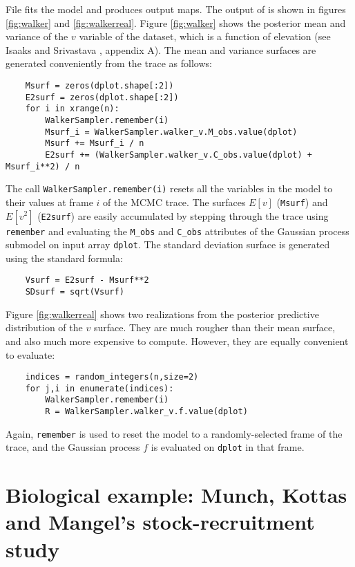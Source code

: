 File  fits the model and produces output maps.  The output of  is shown in figures \ref{fig:walker} and \ref{fig:walkerreal}. Figure \ref{fig:walker} shows the posterior mean and variance of the $v$ variable of the dataset, which is a function of elevation (see Isaaks and Srivastava \cite{isaaks}, appendix A). The mean and variance surfaces are generated conveniently from the trace as follows:
\begin{verbatim}
    Msurf = zeros(dplot.shape[:2])
    E2surf = zeros(dplot.shape[:2])
    for i in xrange(n):
        WalkerSampler.remember(i)
        Msurf_i = WalkerSampler.walker_v.M_obs.value(dplot)
        Msurf += Msurf_i / n
        E2surf += (WalkerSampler.walker_v.C_obs.value(dplot) + Msurf_i**2) / n
\end{verbatim}
The call \texttt{WalkerSampler.remember(i)} resets all the variables in the model to their values at frame $i$ of the MCMC trace. The surfaces $E[v]$ (\texttt{Msurf}) and $E[v^2]$ (\texttt{E2surf}) are easily accumulated by stepping through the trace using \texttt{remember} and evaluating the \texttt{M_obs} and \texttt{C_obs} attributes of the Gaussian process submodel on input array \texttt{dplot}. The standard deviation surface is generated using the standard formula:
\begin{verbatim}
    Vsurf = E2surf - Msurf**2
    SDsurf = sqrt(Vsurf)
\end{verbatim}

Figure \ref{fig:walkerreal} shows two realizations from the posterior predictive distribution of the $v$ surface. They are much rougher than their mean surface, and also much more expensive to compute. However, they are equally convenient to evaluate:
\begin{verbatim}
    indices = random_integers(n,size=2)
    for j,i in enumerate(indices):
        WalkerSampler.remember(i)
        R = WalkerSampler.walker_v.f.value(dplot)
\end{verbatim}
Again, \texttt{remember} is used to reset the model to a randomly-selected frame of the trace, and the Gaussian process $f$ is evaluated on \texttt{dplot} in that frame.






\section{Biological example: Munch, Kottas and Mangel's stock-recruitment study}\label{sub:MMKMCMC}

